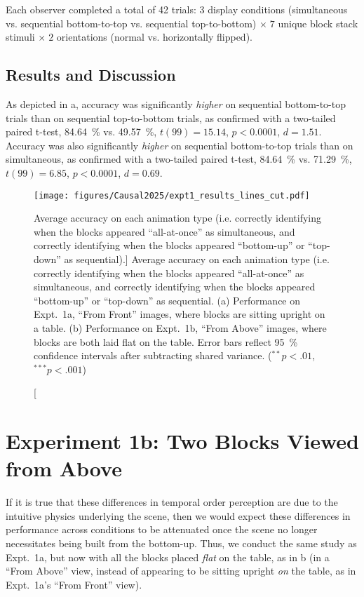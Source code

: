 Each observer completed a total of 42 trials: 3 display conditions (simultaneous vs. sequential bottom-to-top vs. sequential top-to-bottom) $\times\;7$ unique block stack stimuli $\times\;2$ orientations (normal vs. horizontally flipped).
\subsection{Results and Discussion}
As depicted in a, accuracy was significantly \textit{higher} on sequential bottom-to-top trials than on sequential top-to-bottom trials, as confirmed with a two-tailed paired t-test, \qty{84.64}{\percent} vs. \qty{49.57}{\percent}, $t(99) = 15.14$, $p < 0.0001$, $d = 1.51$.  Accuracy was also significantly \textit{higher} on sequential bottom-to-top trials than on simultaneous, as confirmed with a two-tailed paired t-test, \qty{84.64}{\percent} vs. \qty{71.29}{\percent}, $t(99) = 6.85$, $p < 0.0001$, $d = 0.69$.

\begin{figure}
    \centering
    \texttt{[image: figures/Causal2025/expt1\_results\_lines\_cut.pdf]}
    \caption
    [Average accuracy on each animation type (i.e. correctly identifying when the blocks appeared “all-at-once” as simultaneous, and correctly identifying when the blocks appeared “bottom-up” or “top-down” as sequential).]
    {Average accuracy on each animation type (i.e. correctly identifying when the blocks appeared “all-at-once” as simultaneous, and correctly identifying when the blocks appeared “bottom-up” or “top-down” as sequential.  (a) Performance on Expt.~1a, “From Front” images, where blocks are sitting upright on a table.  (b) Performance on Expt.~1b, “From Above” images, where blocks are both laid flat on the table.  Error bars reflect \qty{95}{\percent} confidence intervals after subtracting shared variance. ($^{**}p < .01$, $^{***}p < .001$)}
    \label{fig:CausalHist_3}
\end{figure}

\section{Experiment 1b: Two Blocks Viewed from Above}
If it is true that these differences in temporal order perception are due to the intuitive physics underlying the scene, then we would expect these differences in performance across conditions to be attenuated once the scene no longer necessitates being built from the bottom-up.  Thus, we conduct the same study as Expt.~1a, but now with all the blocks placed \textit{flat} on the table, as in b (in a “From Above” view, instead of appearing to be sitting upright \textit{on} the table, as in Expt.~1a’s “From Front” view).

